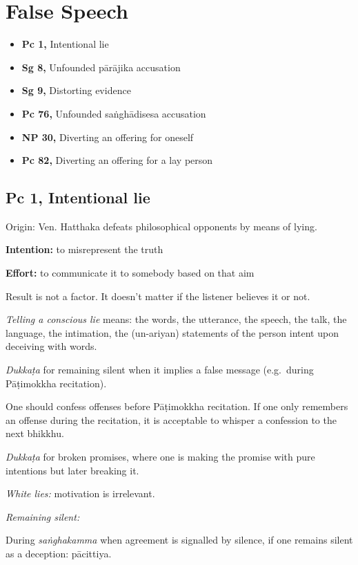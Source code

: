 \chapter{False Speech}

\begin{itemize}
\tightlist
\item
  \textbf{Pc 1,} Intentional lie
\item
  \textbf{Sg 8,} Unfounded pārājika accusation
\item
  \textbf{Sg 9,} Distorting evidence
\item
  \textbf{Pc 76,} Unfounded saṅghādisesa accusation
\item
  \textbf{NP 30,} Diverting an offering for oneself
\item
  \textbf{Pc 82,} Diverting an offering for a lay person
\end{itemize}

\section{Pc 1, Intentional lie}

Origin: Ven. Hatthaka defeats philosophical opponents by means of lying.

\textbf{Intention:} to misrepresent the truth

\textbf{Effort:} to communicate it to somebody based on that aim

Result is not a factor. It doesn't matter if the listener believes it or
not.

\emph{Telling a conscious lie} means: the words, the utterance, the
speech, the talk, the language, the intimation, the (un-ariyan)
statements of the person intent upon deceiving with words.

\emph{Dukkaṭa} for remaining silent when it implies a false message
(e.g.~during Pāṭimokkha recitation).

One should confess offenses before Pāṭimokkha recitation. If one only
remembers an offense during the recitation, it is acceptable to whisper
a confession to the next bhikkhu.

\emph{Dukkaṭa} for broken promises, where one is making the promise with
pure intentions but later breaking it.

\emph{White lies:} motivation is irrelevant.

\emph{Remaining silent:}

During \emph{saṅghakamma} when agreement is signalled by silence, if one
remains silent as a deception: pācittiya.

